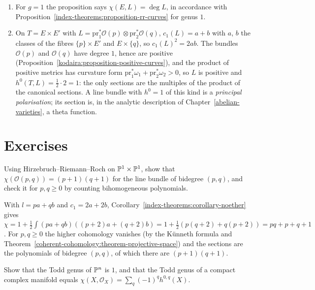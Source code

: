 \begin{example}\label{index-theorems:example-rr-tori}
\begin{enumerate}
\item For $g = 1$ the proposition says $\chi(E, L) = \deg L$, in accordance with Proposition~\ref{index-theorems:proposition-rr-curves} for genus $1$.
\item On $T = E \times E'$ with $L = \mathrm{pr}_1^*\mathcal{O}(p) \otimes \mathrm{pr}_2^*\mathcal{O}(q)$, $c_1(L) = a + b$ with $a$, $b$ the classes of the fibres $\{p\} \times E'$ and $E \times \{q\}$, so
$c_1(L)^2 = 2ab$. The bundles $\mathcal{O}(p)$ and $\mathcal{O}(q)$ have degree $1$, hence are positive (Proposition~\ref{kodaira:proposition-positive-curves}), and the product of positive metrics has curvature form
$\mathrm{pr}_1^*\omega_1 + \mathrm{pr}_2^*\omega_2 > 0$, so $L$ is positive and $h^0(T, L) = \frac12 \cdot 2 = 1$: the only sections are the multiples of the product of the canonical sections. A line bundle with $h^0 = 1$ of this kind is a \emph{principal polarisation}; its section is,
in the analytic description of Chapter~\ref{abelian-varieties}, a theta function.
\end{enumerate}
\end{example}

\section{Exercises}\label{index-theorems:section-exercises}

\begin{exercise}\label{index-theorems:exercise-quadric}
Using Hirzebruch--Riemann--Roch on $\mathbb{P}^1 \times \mathbb{P}^1$, show that $\chi(\mathcal{O}(p, q)) = (p + 1)(q + 1)$ for the line bundle of bidegree $(p, q)$, and check it for $p, q \geq 0$ by counting bihomogeneous polynomials.
\end{exercise}

\begin{solution}
With $l = pa + qb$ and $c_1 = 2a + 2b$, Corollary~\ref{index-theorems:corollary-noether} gives $\chi = 1 + \frac12\int(pa + qb)((p + 2)a + (q + 2)b) = 1 + \frac12(p(q + 2) + q(p + 2)) = pq + p + q + 1$. For $p, q \geq 0$ the higher cohomology
vanishes (by the K\"unneth formula and Theorem~\ref{coherent-cohomology:theorem-projective-space}) and the sections are the polynomials of bidegree $(p, q)$, of which there are $(p + 1)(q + 1)$.
\end{solution}

\begin{exercise}\label{index-theorems:exercise-todd-genus}
Show that the Todd genus of $\mathbb{P}^n$ is $1$, and that the Todd genus of a compact complex manifold equals $\chi(X, \mathcal{O}_X) = \sum_q(-1)^qh^{0,q}(X)$.
\end{exercise}

